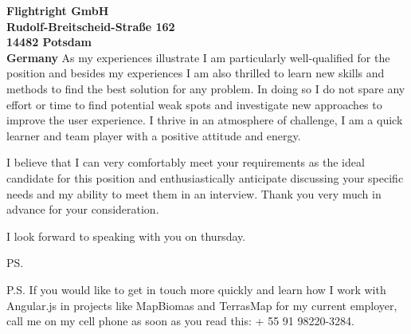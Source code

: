 \documentclass[a4paper]{joaosoares-letter}
\begin{document}
\begin{letter}{\bfseries Flightright GmbH\\Rudolf-Breitscheid-Straße 162\\14482 Potsdam \\Germany}
As my experiences illustrate I am particularly well-qualified for the position and besides my experiences I am also thrilled to learn new skills and methods to find the best solution for any problem. In doing so I do not spare any effort or time to find potential weak spots and investigate new approaches to improve the user experience. I thrive in an atmosphere of challenge, I am a quick learner and team player with a positive attitude and energy.

I believe that I can very comfortably meet your requirements as the ideal candidate for this position and enthusiastically anticipate discussing your specific needs and my ability to meet them in an interview.
Thank you very much in advance for your consideration.


\closing{ I look forward to speaking with you on thursday.}
\vspace{20pt}
\ps

P.S. If you would like to get in touch more quickly and learn how I work with Angular.js in projects like MapBiomas and TerrasMap for my current employer, call me on my cell phone as soon as you read this: + 55 91 98220-3284.

\end{letter}
\end{document}
